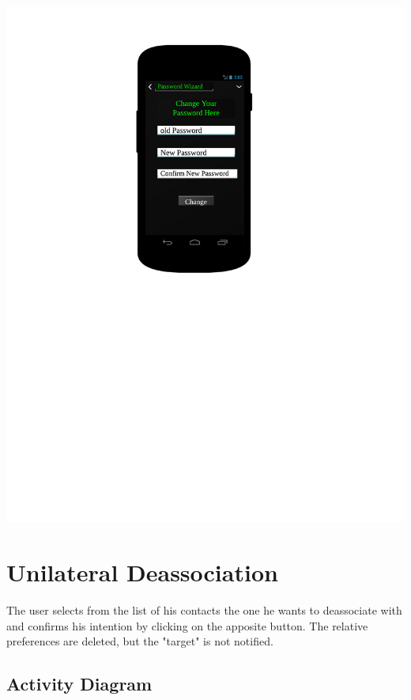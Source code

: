 \includegraphics[scale=0.7]{images/PasswordChange_UI}

\section{Unilateral Deassociation}

The user selects from the list of his contacts the one he wants to deassociate
with and confirms his intention by clicking on the apposite button. The
relative preferences are deleted, but the "target" is not notified.


\newpage
\subsection{Activity Diagram}

